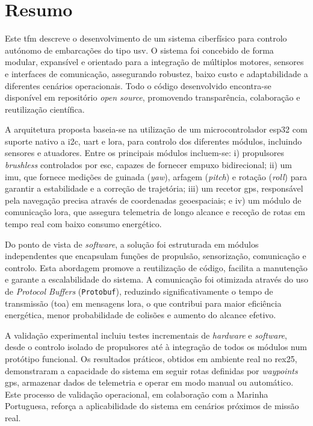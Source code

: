 
\chapter{Resumo}

Este \acrfull{tfm} descreve o desenvolvimento de um sistema ciberfísico para controlo autónomo de embarcações do tipo \acrfull{usv}. O sistema foi concebido de forma modular, expansível e orientado para a integração de múltiplos motores, sensores e interfaces de comunicação, assegurando robustez, baixo custo e adaptabilidade a diferentes cenários operacionais. Todo o código desenvolvido encontra-se disponível em repositório \emph{open source}, promovendo transparência, colaboração e reutilização científica.

A arquitetura proposta baseia-se na utilização de um microcontrolador \acrfull{esp32} com suporte nativo a \acrfull{i2c}, \acrfull{uart} e \acrfull{lora}, para controlo dos diferentes módulos, incluindo sensores e atuadores. Entre os principais módulos incluem-se: i) propulsores \emph{brushless} controlados por \acrfull{esc}, capazes de fornecer empuxo bidirecional; ii) um \acrfull{imu}, que fornece medições de guinada (\emph{yaw}), arfagem (\emph{pitch}) e rotação (\emph{roll}) para garantir a estabilidade e a correção de trajetória; iii) um recetor \acrfull{gps}, responsável pela navegação precisa através de coordenadas geoespaciais; e iv) um módulo de comunicação \acrfull{lora}, que assegura telemetria de longo alcance e receção de rotas em tempo real com baixo consumo energético.

Do ponto de vista de \emph{software}, a solução foi estruturada em módulos independentes que encapsulam funções de propulsão, sensorização, comunicação e controlo. Esta abordagem promove a reutilização de código, facilita a manutenção e garante a escalabilidade do sistema. A comunicação foi otimizada através do uso de \emph{Protocol Buffers} (\texttt{Protobuf}), reduzindo significativamente o tempo de transmissão (\acrfull{toa}) em mensagens \acrfull{lora}, o que contribui para maior eficiência energética, menor probabilidade de colisões e aumento do alcance efetivo.

A validação experimental incluiu testes incrementais de \emph{hardware} e \emph{software}, desde o controlo isolado de propulsores até à integração de todos os módulos num protótipo funcional. Os resultados práticos, obtidos em ambiente real no \acrfull{rex25}, demonstraram a capacidade do sistema em seguir rotas definidas por \emph{waypoints} \acrfull{gps}, armazenar dados de telemetria e operar em modo manual ou automático. Este processo de validação operacional, em colaboração com a Marinha Portuguesa, reforça a aplicabilidade do sistema em cenários próximos de missão real.

